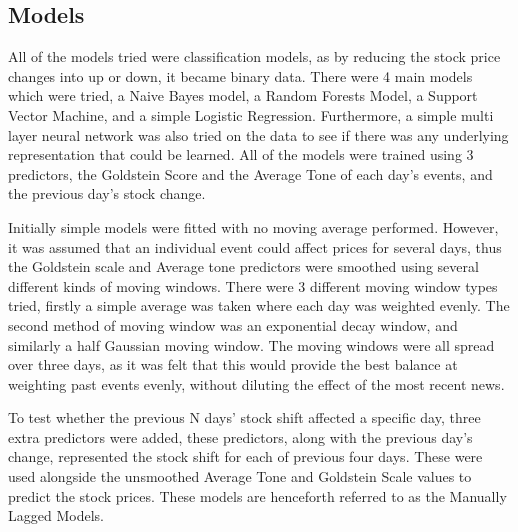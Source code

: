 \subsection{Models}
\label{models}
All of the models tried were classification models, as by reducing the stock price changes into up or down, it became binary data. There were 4 main models which were tried, a Naive Bayes model, a Random Forests Model, a Support Vector Machine, and a simple Logistic Regression. Furthermore, a simple multi layer neural network was also tried on the data to see if there was any underlying representation that could be learned. All of the models were trained using 3 predictors, the Goldstein Score and the Average Tone of each day's events, and the previous day's stock change. 

Initially simple models were fitted with no moving average performed. However, it was assumed that an individual event could affect prices for several days, thus the Goldstein scale and Average tone predictors were smoothed using several different kinds of moving windows. There were 3 different moving window types tried, firstly a simple average was taken where each day was weighted evenly. The second method of moving window was an exponential decay window, and similarly a half Gaussian moving window. The moving windows were all spread over three days, as it was felt that this would provide the best balance at weighting past events evenly, without diluting the effect of the most recent news.

To test whether the previous N days' stock shift affected a specific day, three extra predictors were added, these predictors, along with the previous day's change, represented the stock shift for each of previous four days. These were used alongside the unsmoothed Average Tone and Goldstein Scale values to predict the stock prices. These models are henceforth referred to as the Manually Lagged Models.
